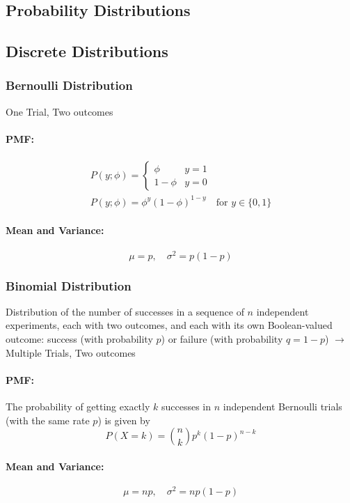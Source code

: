 \documentclass[8pt, a4paper, landscape, includeheadfoot]{extarticle}
\begin{document}
\begin{multicols*}{4}
	\Umbruch

	\section{Probability Distributions}

	\subsection{Discrete Distributions}

	\subsubsection{Bernoulli Distribution}{}
	One Trial, Two outcomes
	\paragraph{PMF:}
	\begin{align*}
		P(y;\phi) = \begin{cases}
			\phi     & y = 1 \\
			1 - \phi & y = 0
		\end{cases} \\
		P(y;\phi) = \phi^y (1-\phi)^{1-y} \quad \text{for } y \in \{0,1\}
	\end{align*}

	\paragraph{Mean and Variance:}
	$$
		\mu = p, \quad \sigma^2 = p(1 - p)
	$$

	\subsubsection{Binomial Distribution}{}
	Distribution of the number of successes in a sequence of $n$ independent experiments, each with two outcomes, and each with its own Boolean-valued outcome: success (with probability $p$) or failure (with probability $q = 1 -p$)
	$\rightarrow$ Multiple Trials, Two outcomes
	\paragraph{PMF:}
	The probability of getting exactly $k$ successes in $n$ independent Bernoulli trials (with the same rate $p$) is given by
	$$
		P(X = k) = \binom{n}{k} p^k (1-p)^{n-k}
	$$
	\paragraph{Mean and Variance:}
	$$
		\mu = np, \quad \sigma^2 = np(1 - p)
	$$


\end{multicols*}
\end{document}
